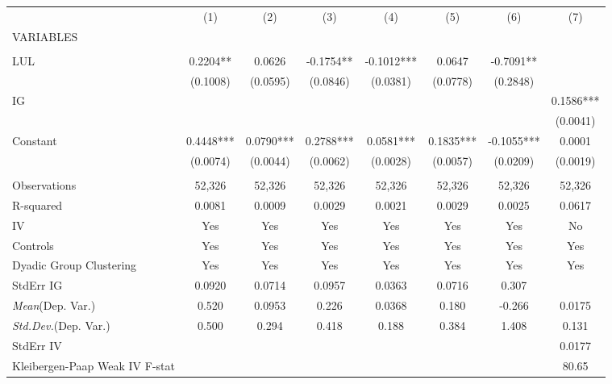 \documentclass[]{article}
\begin{document}
\begin{tabular}{lccccccc} \hline
 & (1) & (2) & (3) & (4) & (5) & (6) & (7) \\
VARIABLES &  &  &  &  &  &  &  \\ \hline
 &  &  &  &  &  &  &  \\
LUL & 0.2204** & 0.0626 & -0.1754** & -0.1012*** & 0.0647 & -0.7091** &  \\
 & (0.1008) & (0.0595) & (0.0846) & (0.0381) & (0.0778) & (0.2848) &  \\
IG &  &  &  &  &  &  & 0.1586*** \\
 &  &  &  &  &  &  & (0.0041) \\
Constant & 0.4448*** & 0.0790*** & 0.2788*** & 0.0581*** & 0.1835*** & -0.1055*** & 0.0001 \\
 & (0.0074) & (0.0044) & (0.0062) & (0.0028) & (0.0057) & (0.0209) & (0.0019) \\
 &  &  &  &  &  &  &  \\
Observations & 52,326 & 52,326 & 52,326 & 52,326 & 52,326 & 52,326 & 52,326 \\
R-squared & 0.0081 & 0.0009 & 0.0029 & 0.0021 & 0.0029 & 0.0025 & 0.0617 \\
IV & Yes & Yes & Yes & Yes & Yes & Yes & No \\
Controls & Yes & Yes & Yes & Yes & Yes & Yes & Yes \\
Dyadic Group Clustering & Yes & Yes & Yes & Yes & Yes & Yes & Yes \\
StdErr IG & 0.0920 & 0.0714 & 0.0957 & 0.0363 & 0.0716 & 0.307 &  \\
\textit{Mean}(Dep. Var.) & 0.520 & 0.0953 & 0.226 & 0.0368 & 0.180 & -0.266 & 0.0175 \\
\textit{Std.Dev.}(Dep. Var.) & 0.500 & 0.294 & 0.418 & 0.188 & 0.384 & 1.408 & 0.131 \\
StdErr IV &  &  &  &  &  &  & 0.0177 \\
 Kleibergen-Paap Weak IV F-stat &  &  &  &  &  &  & 80.65 \\ \hline
\end{tabular}
\end{document}
